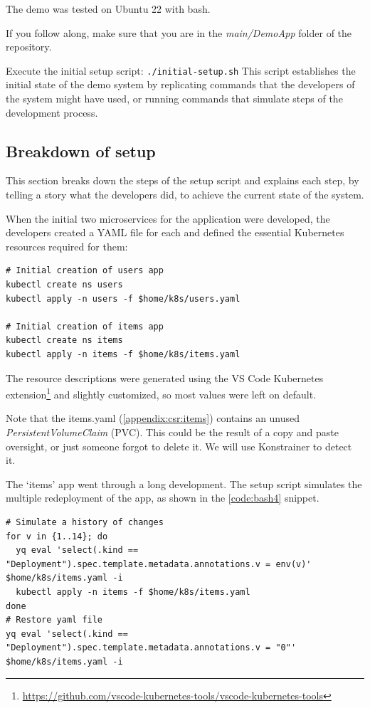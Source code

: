 The demo was tested on Ubuntu 22 with bash.

If you follow along, make sure that you are in the \emph{main/DemoApp} folder of the repository.

Execute the initial setup script: \lstinline|./initial-setup.sh| This script establishes the initial state of the demo system by replicating commands that the developers of the system might have used, or running commands that simulate steps of the development process.

\subsection{Breakdown of setup}

This section breaks down the steps of the setup script and explains each step, by telling a story what the developers did, to achieve the current state of the system.

When the initial two microservices for the application were developed, the developers created a YAML file for each and defined the essential Kubernetes resources required for them:

\begin{lstlisting}[caption={Create first deployment},language=mybash,label=code:bash3]
# Initial creation of users app
kubectl create ns users
kubectl apply -n users -f $home/k8s/users.yaml

# Initial creation of items app
kubectl create ns items
kubectl apply -n items -f $home/k8s/items.yaml
\end{lstlisting}

The resource descriptions were generated using the VS Code Kubernetes extension\footnote{\url{https://github.com/vscode-kubernetes-tools/vscode-kubernetes-tools}} and slightly customized, so most values were left on default.

Note that the items.yaml (\ref{appendix:csr:items}) contains an unused \emph{PersistentVolumeClaim} (PVC). This could be the result of a copy and paste oversight, or just someone forgot to delete it. We will use Konstrainer to detect it.

The `items' app went through a long development. The setup script simulates the multiple redeployment of the app, as shown in the \ref{code:bash4} snippet.

\begin{lstlisting}[caption={Simulate redeployment of the `items' app},language=mybash,label=code:bash4]
# Simulate a history of changes
for v in {1..14}; do
  yq eval 'select(.kind == "Deployment").spec.template.metadata.annotations.v = env(v)' $home/k8s/items.yaml -i
  kubectl apply -n items -f $home/k8s/items.yaml
done
# Restore yaml file
yq eval 'select(.kind == "Deployment").spec.template.metadata.annotations.v = "0"' $home/k8s/items.yaml -i
\end{lstlisting}

